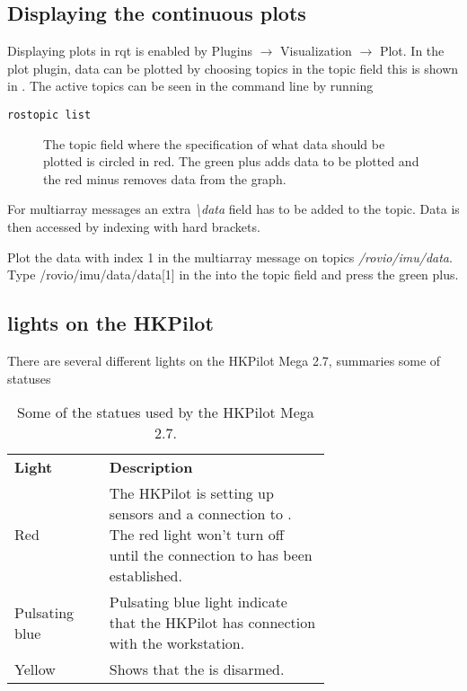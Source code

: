 \subsection{Displaying the continuous plots}
Displaying plots in rqt is enabled by Plugins $\rightarrow$ Visualization $\rightarrow$ Plot. In the plot plugin, data can be plotted by choosing topics in the topic field this is shown in . The active topics can be seen in the command line by running 
\begin{lstlisting}
rostopic list
\end{lstlisting}
\begin{figure}
\centering
{}
\caption{The topic field where the specification of what data should be plotted is circled in red. The green plus adds data to be plotted and the red minus removes data from the graph.}
\label{fig:contplot}
\end{figure}

For multiarray messages an extra \textit{\textbackslash data} field has to be added to the topic. Data is then accessed by indexing with hard brackets. 
\begin{example}
Plot the data with index 1 in the multiarray message on topics \textit{/rovio/imu/data}. Type /rovio/imu/data/data[1] in the into the topic field and press the green plus.  
\end{example}

\subsection{\abbrLED lights on the HKPilot}
There are several different \abbrLED lights on the HKPilot Mega 2.7,  summaries some of \abbrLED statuses
 \begin{table}[tbp]
  \centering
  \caption{\label{tab:ledStatus}%
    Some of the \abbrLED statues used by the HKPilot Mega 2.7.}
  \begin{tabular}{l p{0.7\linewidth}}
    \toprule%
    \textbf{Light}  & \textbf{Description} \\
    \otoprule%
    Red 				& The HKPilot is setting up sensors and a connection to \abbrROS. The red light won't turn off until the connection to \abbrROS has been established.\\
    \midrule
    Pulsating blue 	& Pulsating blue light indicate that the HKPilot has connection with the workstation.\\
    \midrule
    Yellow 			& Shows that the \abbrROV is disarmed. \\
    \bottomrule%
  \end{tabular}
\end{table}

